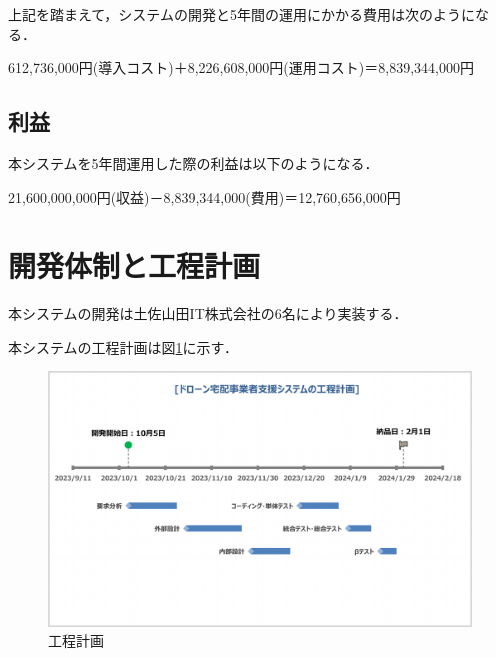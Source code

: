 \documentclass[a4paper, titlepage]{jsarticle}
\begin{document}
上記を踏まえて，システムの開発と5年間の運用にかかる費用は次のようになる．
\begin{center}
    612,736,000円(導入コスト)＋8,226,608,000円(運用コスト)＝8,839,344,000円
\end{center}

\subsection{利益}
本システムを5年間運用した際の利益は以下のようになる．
\begin{center}
    21,600,000,000円(収益)－8,839,344,000(費用)＝12,760,656,000円
\end{center}

\section{開発体制と工程計画}
本システムの開発は土佐山田IT株式会社の6名により実装する．

本システムの工程計画は図\ref{fig:schedule}に示す．
\begin{figure}[htbp]
        \centering
        \label{fig:schedule}
        \includegraphics[width=15cm]{schedule.pdf}
        \caption{工程計画}
\end{figure}
\end{document}
